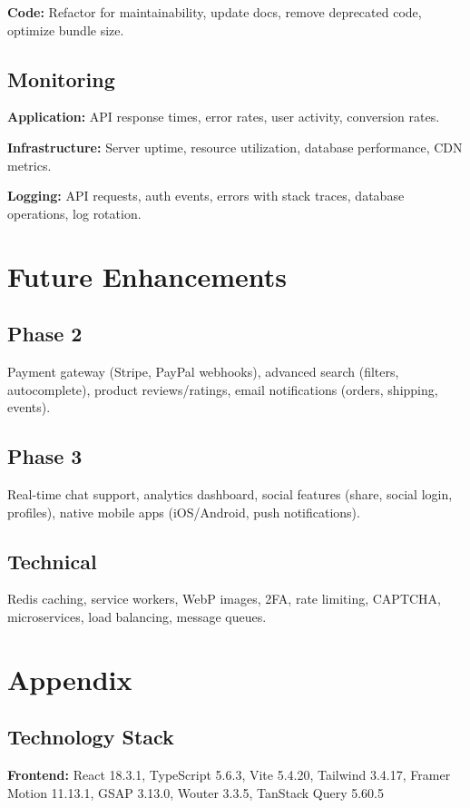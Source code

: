 ﻿\documentclass[11pt]{article}
\begin{document}
\textbf{Code:} Refactor for maintainability, update docs, remove deprecated code, optimize bundle size.

\subsection{Monitoring}
\textbf{Application:} API response times, error rates, user activity, conversion rates.

\textbf{Infrastructure:} Server uptime, resource utilization, database performance, CDN metrics.

\textbf{Logging:} API requests, auth events, errors with stack traces, database operations, log rotation.

\section{Future Enhancements}

\subsection{Phase 2}
Payment gateway (Stripe, PayPal webhooks), advanced search (filters, autocomplete), product reviews/ratings, email notifications (orders, shipping, events).

\subsection{Phase 3}
Real-time chat support, analytics dashboard, social features (share, social login, profiles), native mobile apps (iOS/Android, push notifications).

\subsection{Technical}
Redis caching, service workers, WebP images, 2FA, rate limiting, CAPTCHA, microservices, load balancing, message queues.

\section{Appendix}

\subsection{Technology Stack}
\textbf{Frontend:} React 18.3.1, TypeScript 5.6.3, Vite 5.4.20, Tailwind 3.4.17, Framer Motion 11.13.1, GSAP 3.13.0, Wouter 3.3.5, TanStack Query 5.60.5
\end{document}
